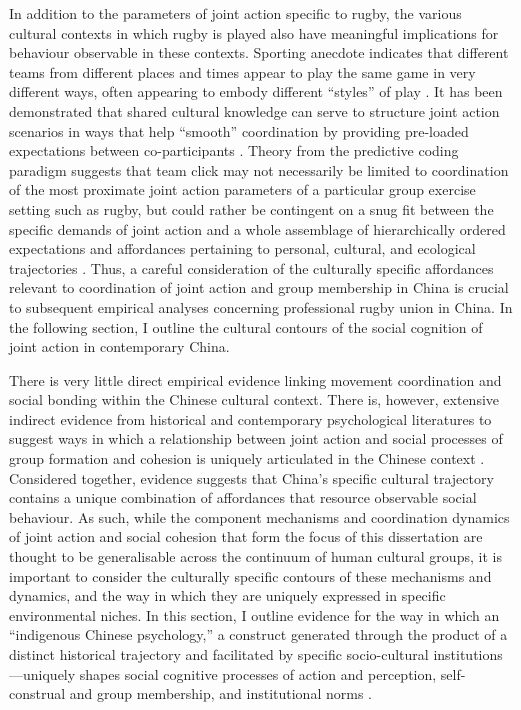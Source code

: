 {In addition to the parameters of joint action specific to rugby, the various cultural contexts in which rugby is played also have meaningful implications for behaviour observable in these contexts.  Sporting anecdote indicates that different teams from different places and times appear to play the same game in very different ways, often appearing to embody different ``styles'' of play \citep{Bourdieu1990,Taylor2010}.  It has been demonstrated that shared cultural knowledge can serve to structure joint action scenarios in ways that help ``smooth'' coordination by providing pre-loaded expectations between co-participants \citep{Vesper2017}.  Theory from the predictive coding paradigm suggests that team click may not necessarily be limited to coordination of the most proximate joint action parameters of a particular group exercise setting such as rugby, but could rather be contingent on a snug fit between the specific demands of joint action and a whole assemblage of hierarchically ordered expectations and affordances pertaining to personal, cultural, and ecological trajectories \citep{Clark2013}.  Thus, a careful consideration of the culturally specific affordances relevant to coordination of joint action and group membership in China is crucial to subsequent empirical analyses concerning professional rugby union in China. In the following section, I outline the cultural contours of the social cognition of joint action in contemporary China.


There is very little direct empirical evidence linking movement coordination and social bonding within the Chinese cultural context. There is, however, extensive indirect evidence from historical and contemporary psychological literatures to suggest ways in which a relationship between joint action and social processes of group formation and cohesion is uniquely articulated in the Chinese context \citep{Weed2011}.  Considered together, evidence suggests that China's specific cultural trajectory contains a unique combination of affordances that resource observable social behaviour.  As such, while the component mechanisms and coordination dynamics of joint action and social cohesion that form the focus of this dissertation are thought to be generalisable across the continuum of human cultural groups, it is important to consider the culturally specific contours of these mechanisms and dynamics, and the way in which they are uniquely expressed in specific environmental niches.  In this section, I outline evidence for the way in which an ``indigenous Chinese psychology,'' a construct generated through the product of a distinct historical trajectory and facilitated by specific socio-cultural institutions---uniquely shapes social cognitive processes of action and perception, self-construal and group membership, and institutional norms \citep{Liu2009}.


}

